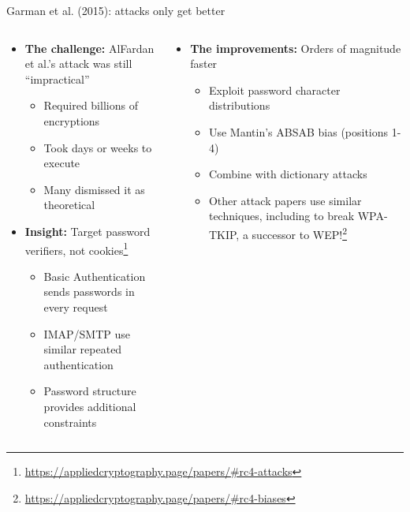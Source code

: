 \documentclass[aspectratio=169, lualatex, handout]{beamer}
\begin{document}
\begin{frame}{Garman et al. (2015): attacks only get better}
	\begin{columns}[c]
		\begin{column}{0.5\textwidth}
			\begin{itemize}[<+->]
				\item \textbf{The challenge:} AlFardan et al.'s attack was still ``impractical''
				      \begin{itemize}[<+->]
					      \item Required billions of encryptions
					      \item Took days or weeks to execute
					      \item Many dismissed it as theoretical
				      \end{itemize}
				\item \textbf{Insight:} Target password verifiers, not cookies\footnote{\url{https://appliedcryptography.page/papers/\#rc4-attacks}}
				      \begin{itemize}[<+->]
					      \item Basic Authentication sends passwords in every request
					      \item IMAP/SMTP use similar repeated authentication
					      \item Password structure provides additional constraints
				      \end{itemize}
			\end{itemize}
		\end{column}
		\begin{column}{0.5\textwidth}
			\begin{itemize}[<+->]
				\item \textbf{The improvements:} Orders of magnitude faster
				      \begin{itemize}[<+->]
					      \item Exploit password character distributions
					      \item Use Mantin's ABSAB bias (positions 1-4)
					      \item Combine with dictionary attacks
					      \item Other attack papers use similar techniques, including to break WPA-TKIP, a successor to WEP!\footnote{\url{https://appliedcryptography.page/papers/\#rc4-biases}}
				      \end{itemize}
			\end{itemize}
		\end{column}
	\end{columns}
\end{frame}
\end{document}
